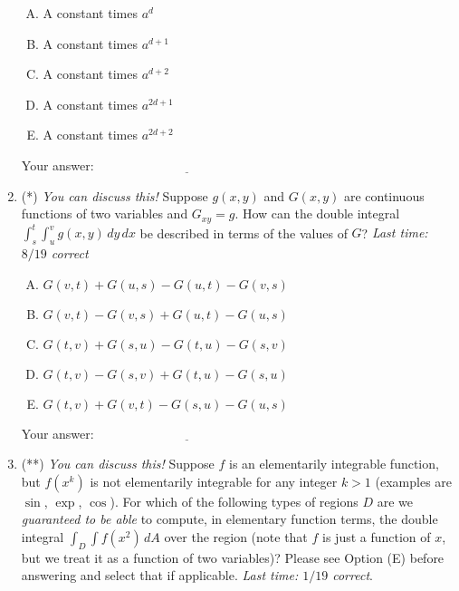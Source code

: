 \documentclass[10pt]{amsart}
\begin{document}
\begin{enumerate}
  \begin{enumerate}[(A)]
  \item A constant times $a^d$
  \item A constant times $a^{d + 1}$
  \item A constant times $a^{d + 2}$
  \item A constant times $a^{2d + 1}$
  \item A constant times $a^{2d + 2}$
  \end{enumerate}

  \vspace{0.1in}
  Your answer: $\underline{\qquad\qquad\qquad\qquad\qquad\qquad\qquad}$
  \vspace{0.15in}

\item (*) {\em You can discuss this!} Suppose $g(x,y)$ and $G(x,y)$
  are continuous functions of two variables and $G_{xy} = g$. How can
  the double integral $\int_s^t \int_u^v g(x,y) \, dy \, dx$ be
  described in terms of the values of $G$? {\em Last time: $8/19$
  correct}

  \begin{enumerate}[(A)]
  \item $G(v,t) + G(u,s) - G(u,t) - G(v,s)$
  \item $G(v,t) - G(v,s) + G(u,t) - G(u,s)$
  \item $G(t,v) + G(s,u) - G(t,u) - G(s,v)$
  \item $G(t,v) - G(s,v) + G(t,u) - G(s,u)$
  \item $G(t,v) + G(v,t) - G(s,u) - G(u,s)$
  \end{enumerate}

  \vspace{0.1in}
  Your answer: $\underline{\qquad\qquad\qquad\qquad\qquad\qquad\qquad}$
  \vspace{0.15in}

\item (**) {\em You can discuss this!} Suppose $f$ is an elementarily
  integrable function, but $f(x^k)$ is not elementarily integrable for
  any integer $k > 1$ (examples are $\sin$, $\exp$, $\cos$). For which
  of the following types of regions $D$ are we {\em guaranteed to be
  able} to compute, in elementary function terms, the double integral
  $\int_D \int f(x^2) \, dA$ over the region (note that $f$ is just a
  function of $x$, but we treat it as a function of two variables)?
  Please see Option (E) before answering and select that if
  applicable. {\em Last time: $1/19$ correct}.


\end{enumerate}
\end{document}
